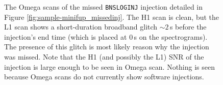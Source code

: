 \begin{figure}[p]
\center
{}
\label{fig:sample-omega_missedinj}
\caption{The Omega scans of the missed \texttt{BNSLOGINJ} injection detailed in
Figure \ref{fig:sample-minifup_missedinj}. The H1 scan is clean, but the L1
scan shows a short-duration broadband glitch $\sim2\,$s before the injection's
end time (which is placed at $0\,$s on the spectrograms). The presence of this
glitch is most likely reason why the injection was missed. Note that the H1
(and possibly the L1) SNR of the injection is large enough to be seen in
Omega scan. Nothing is seen because Omega scans do not currently show software
injections.}
\end{figure}

